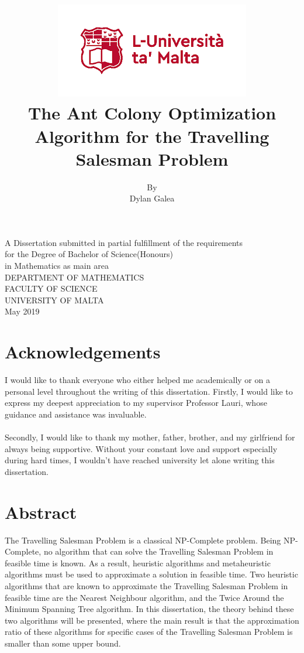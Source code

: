 \documentclass[12pt]{article}
\title{\includegraphics[scale=0.6]{screenshots/crest.png}\\[1cm]
The Ant Colony Optimization Algorithm for the Travelling Salesman Problem\vspace{-2ex}
}
\date{}
\author{By\\Dylan Galea\\[1cm]}
\numberwithin{equation}{subsection}
\numberwithin{table}{subsection}
\numberwithin{algorithm}{subsection}
\begin{document}
\clearpage\maketitle
\thispagestyle{empty}
{\centering A Dissertation submitted in partial fulfillment of the requirements\\
for the Degree of Bachelor of Science(Honours)\\ in Mathematics as main area\\[2cm]}
{\centering DEPARTMENT OF MATHEMATICS\\
FACULTY OF SCIENCE\\ UNIVERSITY OF MALTA\\[2cm]}
{\centering May 2019\\}
\newpage
{\center\section*{Acknowledgements}}
\noindent
I would like to thank everyone who either helped me academically or on a personal level throughout the writing of this dissertation. Firstly, I would like to express my deepest appreciation to my supervisor Professor Lauri, whose guidance and assistance was invaluable.\\\\
Secondly, I would like to thank my mother, father, brother, and my girlfriend for always being supportive. Without your constant love and support especially during hard times, I wouldn't have reached university let alone writing this dissertation.
\newpage
{\center\section*{Abstract}}
\noindent
The Travelling Salesman Problem is a classical NP-Complete problem. Being NP-Complete, no algorithm that can solve the Travelling Salesman Problem in feasible time is known. As a result, heuristic algorithms and metaheuristic algorithms must be used to approximate a solution in feasible time. Two heuristic algorithms that are known to approximate the Travelling Salesman Problem in feasible time are the Nearest Neighbour algorithm, and the Twice Around the Minimum Spanning Tree algorithm. In this dissertation, the theory behind these two algorithms will be presented, where the main result is that the approximation ratio of these algorithms for specific cases of the Travelling Salesman Problem is smaller than some upper bound. \\\\
\end{document}
